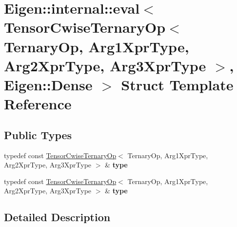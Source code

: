 \hypertarget{struct_eigen_1_1internal_1_1eval_3_01_tensor_cwise_ternary_op_3_01_ternary_op_00_01_arg1_xpr_typ2e0e11b3e51fbd9d6e7353fff125bc73}{}\section{Eigen\+:\+:internal\+:\+:eval$<$ Tensor\+Cwise\+Ternary\+Op$<$ Ternary\+Op, Arg1\+Xpr\+Type, Arg2\+Xpr\+Type, Arg3\+Xpr\+Type $>$, Eigen\+:\+:Dense $>$ Struct Template Reference}
\label{struct_eigen_1_1internal_1_1eval_3_01_tensor_cwise_ternary_op_3_01_ternary_op_00_01_arg1_xpr_typ2e0e11b3e51fbd9d6e7353fff125bc73}
\subsection*{Public Types}
\begin{DoxyCompactItemize}
\item 
\mbox{\label{struct_eigen_1_1internal_1_1eval_3_01_tensor_cwise_ternary_op_3_01_ternary_op_00_01_arg1_xpr_typ2e0e11b3e51fbd9d6e7353fff125bc73_a270f7c0d71560a21e4b67bb4398d5000}} 
typedef const \hyperlink{class_eigen_1_1_tensor_cwise_ternary_op}{Tensor\+Cwise\+Ternary\+Op}$<$ Ternary\+Op, Arg1\+Xpr\+Type, Arg2\+Xpr\+Type, Arg3\+Xpr\+Type $>$ \& {\bfseries type}
\item 
\mbox{\label{struct_eigen_1_1internal_1_1eval_3_01_tensor_cwise_ternary_op_3_01_ternary_op_00_01_arg1_xpr_typ2e0e11b3e51fbd9d6e7353fff125bc73_a270f7c0d71560a21e4b67bb4398d5000}} 
typedef const \hyperlink{class_eigen_1_1_tensor_cwise_ternary_op}{Tensor\+Cwise\+Ternary\+Op}$<$ Ternary\+Op, Arg1\+Xpr\+Type, Arg2\+Xpr\+Type, Arg3\+Xpr\+Type $>$ \& {\bfseries type}
\end{DoxyCompactItemize}


\subsection{Detailed Description}
